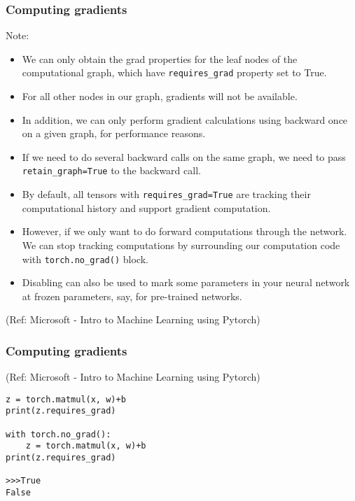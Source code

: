 \begin{frame}[fragile] \frametitle{Computing gradients}

Note:
\begin{itemize}
\item We can only obtain the grad properties for the leaf nodes of the computational graph, which have \lstinline|requires_grad| property set to True. 
\item For all other nodes in our graph, gradients will not be available. 
\item In addition, we can only perform gradient calculations using backward once on a given graph, for performance reasons. 
\item If we need to do several backward calls on the same graph, we need to pass \lstinline|retain_graph=True| to the backward call.
\item By default, all tensors with \lstinline|requires_grad=True| are tracking their computational history and support gradient computation. 
\item However, if we only want to do forward computations through the network. We can stop tracking computations by surrounding our computation code with \lstinline|torch.no_grad()| block.
\item Disabling can also be used to mark some parameters in your neural network at frozen parameters, say, for pre-trained networks.
\end{itemize}

\tiny{(Ref: Microsoft - Intro to Machine Learning using Pytorch)}



\end{frame}

\begin{frame}[fragile] \frametitle{Computing gradients}

\tiny{(Ref: Microsoft - Intro to Machine Learning using Pytorch)}


\begin{lstlisting}
z = torch.matmul(x, w)+b
print(z.requires_grad)

with torch.no_grad():
    z = torch.matmul(x, w)+b
print(z.requires_grad)

>>>True
False
\end{lstlisting}

\end{frame}


